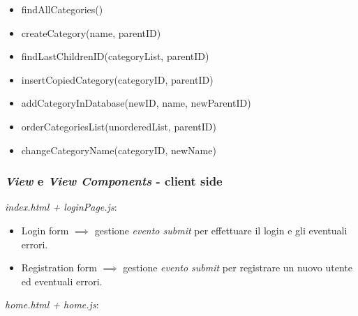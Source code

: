 \begin{itemize}
\begin{itemize}
    \begin{itemize}
    \tightlist
    \item
      findAllCategories()
    \item
      createCategory(name, parentID)
    \item
      findLastChildrenID(categoryList, parentID)
    \item
      insertCopiedCategory(categoryID, parentID)
    \item
      addCategoryInDatabase(newID, name, newParentID)
    \item
      orderCategoriesList(unorderedList, parentID)
    \item
      changeCategoryName(categoryID, newName)
    \end{itemize}
  \end{itemize}
\end{itemize}

\pagebreak

\hypertarget{view-e-view-components---client-side}{%
\subsubsection{\texorpdfstring{\emph{View} e \emph{View Components} -
client
side}{View e View Components - client side}}\label{view-e-view-components---client-side}}

\emph{index.html + loginPage.js}:

\begin{itemize}
\tightlist
\item
  Login form \(\implies\) gestione \emph{evento submit} per effettuare
  il login e gli eventuali errori.
\item
  Registration form \(\implies\) gestione \emph{evento submit} per
  registrare un nuovo utente ed eventuali errori.
\end{itemize}

\emph{home.html + home.js}:

